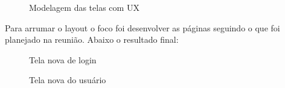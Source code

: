 \begin{figure}[H]
  \centering
  \caption{Modelagem das telas com UX}\label{figura:ux}
\end{figure}

Para arrumar o layout o foco foi desenvolver as páginas seguindo o que foi planejado na reunião. Abaixo o resultado final:

\begin{figure}[H]
  \centering
  \caption{Tela nova de login}\label{figura:loginNovo}
\end{figure}

\begin{figure}[H]
  \centering
  \caption{Tela nova do usuário}\label{figura:indexNovo}
\end{figure}

